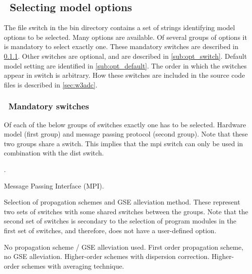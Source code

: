 \vssub
\subsection{~Selecting model options} \label{sec:switches}
\vssub

The file {\file switch} in the {\file bin} directory contains a set of strings
identifying model options to be selected. Many options are available. Of
several groups of options it is mandatory to select exactly one. These
mandatory switches are described in \para\ref{sub:man_switch}. Other switches
are optional, and are described in \para\ref{sub:opt_switch}. Default model
setting are identified in \para\ref{sub:opt_default}. The order in which the
switches appear in {\file switch} is arbitrary. How these switches are
included in the source code files is described in \para\ref{sec:w3adc}.

\vsssub
\subsubsection{~Mandatory switches} \label{sub:man_switch}
\vsssub

Of each of the below groups of switches exactly one has to be selected. 
Hardware model (first group) and message passing protocol (second group). Note
that these two groups share a switch. This implies that the {\sc mpi} switch
can only be used in combination with the {\sc dist} switch.
\begin{slist}
.
\end{slist}

\begin{slist}
 {Message Passing Interface (MPI).}
\end{slist}

\noindent
Selection of propagation schemes and GSE alleviation method. These represent
two sets of switches with some shared switches between the groups. Note that
the second set of switches is secondary to the selection of program modules
in the first set of switches, and therefore, does not have a user-defined
option.
\begin{slist}
 {No propagation scheme / GSE alleviation used.}
 {First order propagation scheme, no GSE alleviation.}
 {Higher-order schemes with \cite{art:BH87} dispersion correction.}
 {Higher-order schemes with \cite{tol:OMOD02b} averaging technique.}
\end{slist}

